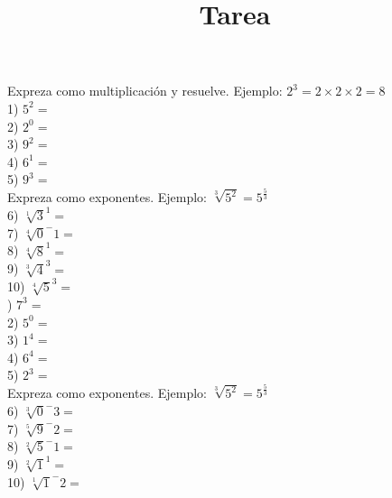 \documentclass[a4paper,12pt]{article}
\title{Tarea}
\author{}
\date{}
\begin{document}
\maketitle
 Expreza como multiplicación y  resuelve.
 Ejemplo: $2^3=2 \times 2 \times 2 = 8$  \vspace{0.5cm}\\ 
1) $5^2=$\vspace{1cm}\\ 
2) $2^0=$\vspace{1cm}\\ 
3) $9^2=$\vspace{1cm}\\ 
4) $6^1=$\vspace{1cm}\\ 
5) $9^3=$\vspace{1cm}\\ 
 Expreza como exponentes.
 Ejemplo: $\sqrt[3]{5^2}=5^\frac{5}{3} $  \vspace{0.5cm}\\ 
6) $\sqrt[1]{3}^1=$\vspace{1cm}\\ 
7) $\sqrt[4]{0}^-1=$\vspace{1cm}\\ 
8) $\sqrt[4]{8}^1=$\vspace{1cm}\\ 
9) $\sqrt[3]{4}^3=$\vspace{1cm}\\ 
10) $\sqrt[4]{5}^3=$\vspace{1cm}\\ 

 ) $7^3=$\vspace{1cm}\\ 
2) $5^0=$\vspace{1cm}\\ 
3) $1^4=$\vspace{1cm}\\ 
4) $6^4=$\vspace{1cm}\\ 
5) $2^3=$\vspace{1cm}\\ 
 Expreza como exponentes.
 Ejemplo: $\sqrt[3]{5^2}=5^\frac{5}{3} $  \vspace{0.5cm}\\ 
6) $\sqrt[3]{0}^-3=$\vspace{1cm}\\ 
7) $\sqrt[5]{9}^-2=$\vspace{1cm}\\ 
8) $\sqrt[2]{5}^-1=$\vspace{1cm}\\ 
9) $\sqrt[2]{1}^1=$\vspace{1cm}\\ 
10) $\sqrt[1]{1}^-2=$\vspace{1cm}\\ 
\end{document}
